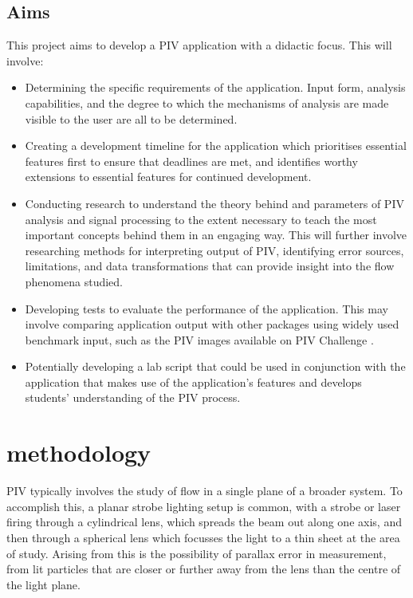 \documentclass[12pt, a4paper]{amsart}
\begin{document}
\subsection{Aims}
This project aims to develop a PIV application with a didactic focus. This will involve:
\begin{itemize}
	\item Determining the specific requirements of the application. Input form, analysis capabilities, and the degree to which the mechanisms of analysis are made visible to the user are all to be determined.
	\item Creating a development timeline for the application which prioritises essential features first to ensure that deadlines are met, and identifies worthy extensions to essential features for continued development.
	\item Conducting research to understand the theory behind and parameters of PIV analysis and signal processing to the extent necessary to teach the most important concepts behind them in an engaging way.  This will further involve researching methods for interpreting output of PIV, identifying error sources, limitations, and data transformations that can provide insight into the flow phenomena studied.
	\item Developing tests to evaluate the performance of the application. This may involve comparing application output with other packages using widely used benchmark input, such as the PIV images available on PIV Challenge \cite{pivchallenge}.
	\item Potentially developing a lab script that could be used in conjunction with the application that makes use of the application's features and develops students' understanding of the PIV process. 
\end{itemize}


\section{methodology}
PIV typically involves the study of flow in a single plane of a broader system. To accomplish this, a planar strobe lighting setup is common, with a strobe or laser firing through a cylindrical lens, which spreads the beam out along one axis, and then through a spherical lens which focusses the light to a thin sheet at the area of study. Arising from this is the possibility of parallax error in measurement, from lit particles that are closer or further away from the lens than the centre of the light plane. 


\end{document}
